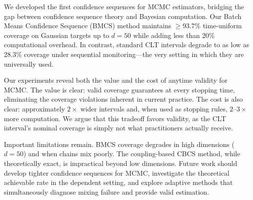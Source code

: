 \documentclass[11pt]{article}
\begin{document}
We developed the first confidence sequences for MCMC estimators, bridging the gap between confidence sequence theory and Bayesian computation. Our Batch Means Confidence Sequence (BMCS) method maintains $\geq 93.7\%$ time-uniform coverage on Gaussian targets up to $d=50$ while adding less than 20\% computational overhead. In contrast, standard CLT intervals degrade to as low as 28.3\% coverage under sequential monitoring---the very setting in which they are universally used.

Our experiments reveal both the value and the cost of anytime validity for MCMC. The value is clear: valid coverage guarantees at every stopping time, eliminating the coverage violations inherent in current practice. The cost is also clear: approximately $2\times$ wider intervals and, when used as stopping rules, $2$--$3\times$ more computation. We argue that this tradeoff favors validity, as the CLT interval's nominal coverage is simply not what practitioners actually receive.

Important limitations remain. BMCS coverage degrades in high dimensions ($d=50$) and when chains mix poorly. The coupling-based CBCS method, while theoretically exact, is impractical beyond low dimensions. Future work should develop tighter confidence sequences for MCMC, investigate the theoretical achievable rate in the dependent setting, and explore adaptive methods that simultaneously diagnose mixing failure and provide valid estimation.


\end{document}
